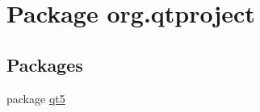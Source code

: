 \hypertarget{namespaceorg_1_1qtproject}{}\section{Package org.\+qtproject}
\label{namespaceorg_1_1qtproject}
\subsection*{Packages}
\begin{DoxyCompactItemize}
\item 
package \hyperlink{namespaceorg_1_1qtproject_1_1qt5}{qt5}
\end{DoxyCompactItemize}
